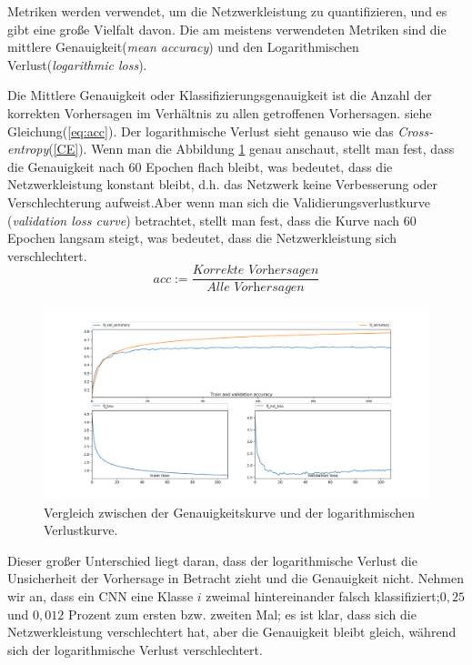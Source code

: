 \documentclass[12pt,a4paper]{scrartcl}
\numberwithin{equation}{section}
\begin{document}
Metriken werden verwendet, um die Netzwerkleistung zu quantifizieren, und es gibt eine große Vielfalt davon. Die am meistens verwendeten Metriken sind  die mittlere Genauigkeit(\textit{mean accuracy}) und den Logarithmischen Verlust(\textit{logarithmic loss}).

Die Mittlere Genauigkeit oder Klassifizierungsgenauigkeit ist die Anzahl der korrekten Vorhersagen im Verhältnis zu allen getroffenen Vorhersagen. siehe Gleichung(\ref{eq:acc}).
Der logarithmische Verlust sieht genauso wie das \textit{Cross-entropy}(\ref{CE}). Wenn man die Abbildung \ref{fig:accVSlogLoss} genau anschaut, stellt man fest, dass die Genauigkeit nach 60 Epochen flach bleibt, was bedeutet, dass die Netzwerkleistung konstant bleibt, d.h. das Netzwerk keine Verbesserung oder Verschlechterung aufweist.Aber wenn man sich die Validierungsverlustkurve  (\textit{validation loss curve}) betrachtet, stellt man fest, dass die Kurve nach 60 Epochen langsam steigt, was bedeutet, dass die Netzwerkleistung sich verschlechtert.
\begin{equation}\label{eq:acc}
	acc := \dfrac{\textit{Korrekte Vorhersagen}}{\textit{Alle Vorhersagen}}
\end{equation}

\begin{figure}[h]
	\includegraphics[width=\textwidth]{accVSlogLoss}
	\caption{Vergleich zwischen der Genauigkeitskurve und der logarithmischen Verlustkurve. }
	\label{fig:accVSlogLoss}
\end{figure}

Dieser großer Unterschied liegt daran, dass der logarithmische Verlust die Unsicherheit der Vorhersage in Betracht zieht und die Genauigkeit nicht. Nehmen wir an, dass ein \ac{CNN} eine Klasse $ i $ zweimal hintereinander falsch klassifiziert;$ 0,25 $ und $ 0,012 $ Prozent zum ersten bzw. zweiten Mal; es ist klar, dass sich die Netzwerkleistung verschlechtert hat, aber die Genauigkeit bleibt gleich, während sich der logarithmische Verlust verschlechtert. \\
\end{document}
